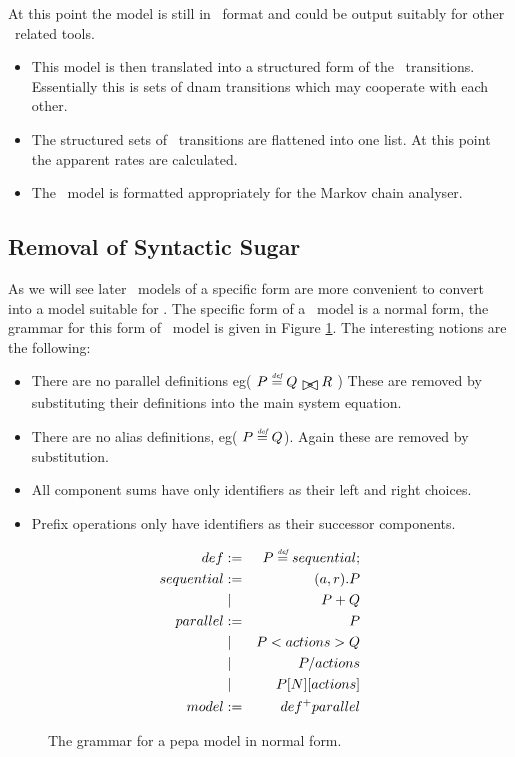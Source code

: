 At this point the model is still in \pepa\ format and could be output
suitably for other \pepa\ related tools. 

\begin{itemize}
\item This model is then translated into a structured form of the
\hydra\ transitions. Essentially this is sets of dnam transitions which may
cooperate with each other.
\item The structured sets of \hydra\ transitions are flattened into one list.
At this point the apparent rates are calculated.
\item The \hydra\ model is formatted appropriately for the
\hydra\cite{pepahydra}
Markov chain analyser.
\end{itemize}

\subsection{Removal of Syntactic Sugar}
As we will see later \pepa\ models of a specific form are more convenient to
convert into a model suitable for \hydra.
The specific form of a \pepa\ model is a normal form, the grammar for
this form of \pepa\ model is given in Figure
\ref{figure:pepaNormalForm:grammar}.
The interesting notions are the following:
\begin{itemize}
\item There are no parallel definitions
eg( $P \rmdef Q \sync{} R$ )
These are removed by substituting their definitions into the main system
equation.
\item There are no alias definitions,
eg( $P \stackrel{\mbox{\em {\tiny def}}}{=} Q$). Again these are removed by substitution.
\item All component sums have only identifiers as their left and right choices.
\item Prefix operations only have identifiers as their successor components.
\end{itemize}

\begin{figure}
\begin{eqnarray*}
def & := & P \stackrel{\mbox{\em {\tiny def}}}{=} sequential ;    \\
sequential & :=   & (a, r) . P      \\
           & \mid & P + Q           \\
parallel   & :=   & P               \\
           & \mid & P < actions > Q \\
           & \mid & P / { actions } \\
           & \mid & P[N][actions]   \\
model      & :=   & def^+ parallel  \\
\end{eqnarray*}
\caption{
\label{figure:pepaNormalForm:grammar}
The grammar for a pepa model in normal form.
}
\end{figure}

